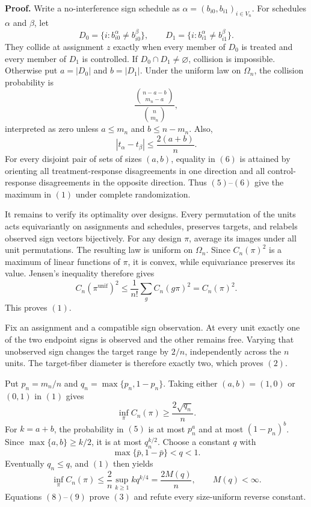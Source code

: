 \textbf{Proof.}
Write a no-interference sign schedule as \(\alpha=(b_{i0},b_{i1})_{i\in V_n}\). For schedules \(\alpha\) and \(\beta\), let
\[
 D_0=\{i:b_{i0}^\alpha\ne b_{i0}^\beta\},
 \qquad
 D_1=\{i:b_{i1}^\alpha\ne b_{i1}^\beta\}. \tag{4}
\]
They collide at assignment \(z\) exactly when every member of \(D_0\) is treated and every member of \(D_1\) is controlled. If \(D_0\cap D_1\ne\varnothing\), collision is impossible. Otherwise put \(a=|D_0|\) and \(b=|D_1|\). Under the uniform law on \(\Omega_n\), the collision probability is
\[
 \frac{\binom{n-a-b}{m_n-a}}{\binom n{m_n}}, \tag{5}
\]
interpreted as zero unless \(a\le m_n\) and \(b\le n-m_n\). Also,
\[
 |t_\alpha-t_\beta|
 \le\frac{2(a+b)}n. \tag{6}
\]
For every disjoint pair of sets of sizes \((a,b)\), equality in \((6)\) is attained by orienting all treatment-response disagreements in one direction and all control-response disagreements in the opposite direction. Thus \((5)\)--\((6)\) give the maximum in \((1)\) under complete randomization.

It remains to verify its optimality over designs. Every permutation of the units acts equivariantly on assignments and schedules, preserves targets, and relabels observed sign vectors bijectively. For any design \(\pi\), average its images under all unit permutations. The resulting law is uniform on \(\Omega_n\). Since \(C_n(\pi)^2\) is a maximum of linear functions of \(\pi\), it is convex, while equivariance preserves its value. Jensen's inequality therefore gives
\[
 C_n(\pi^{\mathrm{unif}})^2
 \le \frac1{n!}\sum_g C_n(g\pi)^2
 =C_n(\pi)^2. \tag{7}
\]
This proves \((1)\).

Fix an assignment and a compatible sign observation. At every unit exactly one of the two endpoint signs is observed and the other remains free. Varying that unobserved sign changes the target range by \(2/n\), independently across the \(n\) units. The target-fiber diameter is therefore exactly two, which proves \((2)\).

Put \(p_n=m_n/n\) and \(q_n=\max\{p_n,1-p_n\}\). Taking either \((a,b)=(1,0)\) or \((0,1)\) in \((1)\) gives
\[
 \inf_\pi C_n(\pi)\ge\frac{2\sqrt{q_n}}n. \tag{8}
\]
For \(k=a+b\), the probability in \((5)\) is at most \(p_n^a\) and at most \((1-p_n)^b\). Since \(\max\{a,b\}\ge k/2\), it is at most \(q_n^{k/2}\). Choose a constant \(q\) with
\[
 \max\{\bar p,1-\bar p\}<q<1.
\]
Eventually \(q_n\le q\), and \((1)\) then yields
\[
 \inf_\pi C_n(\pi)
 \le\frac2n\sup_{k\ge1}kq^{k/4}
 =\frac{2M(q)}n,
 \qquad M(q)<\infty. \tag{9}
\]
Equations \((8)\)--\((9)\) prove \((3)\) and refute every size-uniform reverse constant.

